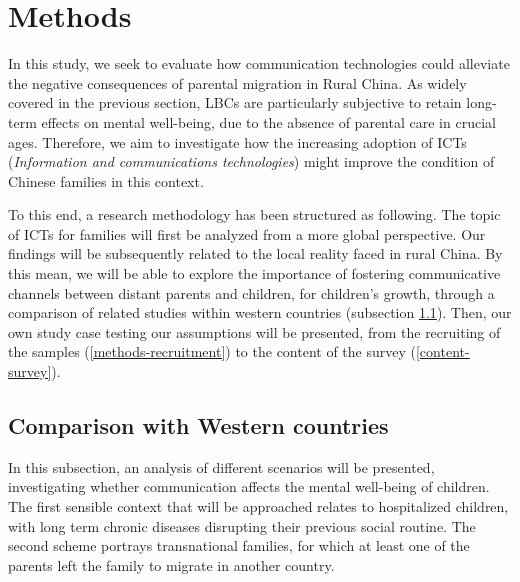 \section{Methods}
\label{methods}


In this study, we seek to evaluate how communication technologies could alleviate the negative consequences of parental migration in Rural China. As widely covered in the previous section, LBCs are particularly subjective to retain long-term effects on mental well-being, due to the absence of parental care in crucial ages. Therefore, we aim to investigate how the increasing adoption of ICTs (\textit{Information and communications technologies}) might improve the condition of Chinese families in this context.

To this end, a research methodology has been structured as following. The topic of ICTs for families will first be analyzed from a more global perspective. Our findings will be subsequently related to the local reality faced in rural China. By this mean, we will be able to explore the importance of fostering communicative channels between distant parents and children, for children's growth, through a comparison of related studies within western countries (subsection \ref{methods-compare}). Then, our own study case testing our assumptions will be presented, from the recruiting of the samples (\ref{methods-recruitment}) to the content of the survey (\ref{content-survey}).

\subsection{Comparison with Western countries}
\label{methods-compare}

In this subsection, an analysis of different scenarios will be presented, investigating whether communication affects the mental well-being of children. The first sensible context that will be approached relates to hospitalized children, with long term chronic diseases disrupting their previous social routine. The second scheme portrays transnational families, for which at least one of the parents left the family to migrate in another country. 



